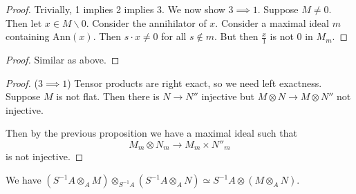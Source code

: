 \begin{proof}
    Trivially, 1 implies 2 implies 3.
    We now show $3\implies 1$.
    Suppose $M\neq 0$. Then let $x\in M\backslash{0}$. Consider the annihilator of $x$. Consider a maximal ideal $m$ containing Ann$(x)$. Then $s\cdot x\neq 0$ for all $s\notin m$. But then $\frac{x}{1}$ is not $0$ in $M_m$.
\end{proof}
\begin{proof}
    Similar as above.
\end{proof}
\begin{proof}
    ($3\implies 1$)
    Tensor products are right exact, so we need left exactness. Suppose $M$ is not flat.
    Then there is $N\to N''$ injective but $M\otimes N\to M\otimes N''$ not injective.

    Then by the previous proposition we have a maximal ideal such that \[
    M_m\otimes N_m \to M_m\times N''_m
    \] is not injective.

\end{proof}
\begin{remark}
    We have $(S^{-1}A\otimes_A M )\otimes _{S^{-1}A} (S^{-1}A\otimes_A N)\simeq S^{-1}A\otimes (M \otimes_A N)$.
\end{remark}